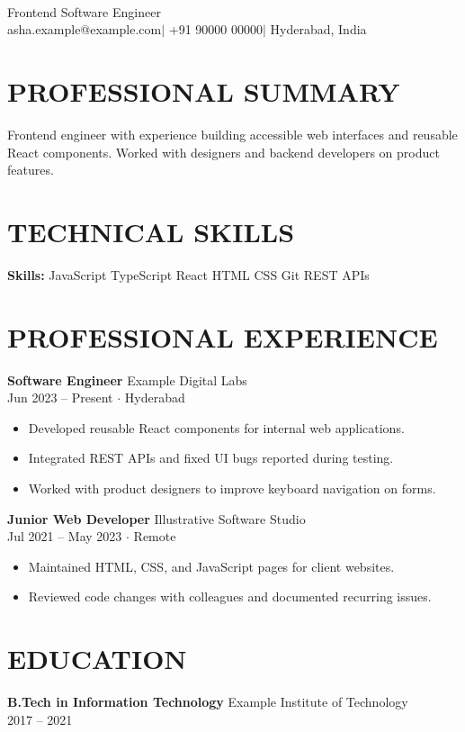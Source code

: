 \documentclass[10pt,a4paper]{article}
\begin{document}
\raggedright
{\\[3pt]
{\color{ink}\large Frontend Software Engineer}\\[3pt]
{\small asha.example@example.com\quad $\vert$ \quad +91 90000 00000\quad $\vert$ \quad Hyderabad, India}\par}
\section*{PROFESSIONAL SUMMARY}
Frontend engineer with experience building accessible web interfaces and reusable React components. Worked with designers and backend developers on product features.
\section*{TECHNICAL SKILLS}
\textbf{Skills:} JavaScript \textbullet{} TypeScript \textbullet{} React \textbullet{} HTML \textbullet{} CSS \textbullet{} Git \textbullet{} REST APIs
\section*{PROFESSIONAL EXPERIENCE}
\textbf{Software Engineer} \textbar{} Example Digital Labs\\
{\small\color{ink}Jun 2023 -- Present \quad $\cdot$ \quad Hyderabad}\\[1pt]
\begin{itemize}
\item Developed reusable React components for internal web applications.
\item Integrated REST APIs and fixed UI bugs reported during testing.
\item Worked with product designers to improve keyboard navigation on forms.
\end{itemize}
\vspace{2pt}
\textbf{Junior Web Developer} \textbar{} Illustrative Software Studio\\
{\small\color{ink}Jul 2021 -- May 2023 \quad $\cdot$ \quad Remote}\\[1pt]
\begin{itemize}
\item Maintained HTML, CSS, and JavaScript pages for client websites.
\item Reviewed code changes with colleagues and documented recurring issues.
\end{itemize}
\vspace{2pt}
\section*{EDUCATION}
\textbf{B.Tech in Information Technology} \textbar{} Example Institute of Technology\\
{\small 2017 -- 2021}\\[2pt]
\end{document}
